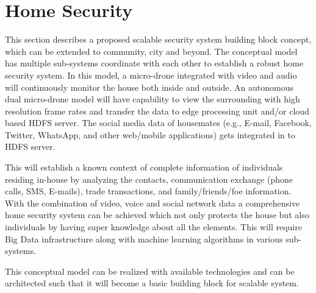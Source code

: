 \documentclass[sigconf]{acmart}
\begin{document}
\section{Home Security}
This section describes a proposed scalable security system building block concept, which can be extended to community, city and beyond.  The conceptual model has multiple sub-systems coordinate with each other to establish a robust home security system. In this model, a micro-drone integrated with video and audio will continuously monitor the house both inside and outside. An autonomous dual micro-drone model will have capability to view the surrounding with high resolution frame rates and transfer the data to edge processing unit and/or cloud based HDFS server. The social media data of housemates (e.g., E-mail, Facebook, Twitter, WhatsApp, and other web/mobile applications) gets integrated in to HDFS server.

This will establish a known context of complete information of individuals residing in-house by analyzing the contacts, communication exchange (phone calls, SMS, E-mails), trade transactions, and family/friends/foe information. With the combination of video, voice and social network data a comprehensive home security system can be achieved which not only protects the house but also individuals by having super knowledge about all the elements. This will require Big Data infrastructure along with machine learning algorithms in various sub-systems.

This conceptual model can be realized with available technologies and can be architected such that it will become a basic building block for scalable system.
\end{document}
